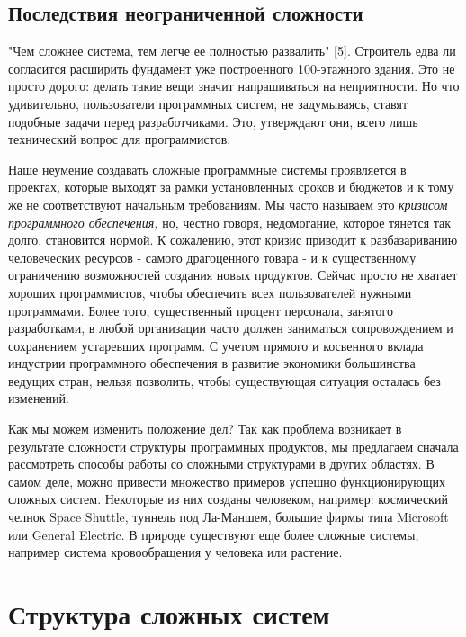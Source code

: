 \documentclass[a4paper,12pt]{article}
\begin{document}
\subsection{Последствия неограниченной сложности}
\begin{small}
\parindent=1.25cm
\hspace{1 cm}
"Чем сложнее система, тем легче ее полностью развалить" [5]. Строитель едва ли согласится расширить фундамент уже построенного 100-этажного здания. Это не просто дорого: делать такие вещи значит напрашиваться на неприятности. Но что удивительно, пользователи программных систем, не задумываясь, ставят подобные задачи перед разработчиками. Это, утверждают они, всего лишь технический вопрос для программистов.\par \medskip 
Наше неумение создавать сложные программные системы проявляется в проектах, которые выходят за рамки установленных сроков и бюджетов и к тому же не соответствуют начальным требованиям. Мы часто называем это \textit{кризисом программного обеспечения,} но, честно говоря, недомогание, которое тянется так долго, становится нормой. К сожалению, этот кризис приводит к разбазариванию человеческих ресурсов - самого драгоценного товара - и к существенному ограничению возможностей создания новых продуктов. Сейчас просто не хватает хороших программистов, чтобы обеспечить всех пользователей нужными программами. Более того, существенный процент персонала, занятого разработками, в любой организации часто должен заниматься сопровождением и сохранением устаревших программ. С учетом прямого и косвенного вклада индустрии программного обеспечения в развитие экономики большинства ведущих стран, нельзя позволить, чтобы существующая ситуация осталась без изменений. \par \medskip
Как мы можем изменить положение дел? Так как проблема возникает в результате сложности структуры программных продуктов, мы предлагаем сначала рассмотреть способы работы со сложными структурами в других областях. В самом деле, можно привести множество примеров успешно функционирующих сложных систем. Некоторые из них созданы человеком, например: космический челнок Space Shuttle, туннель под Ла-Маншем, большие фирмы типа Microsoft или General Electric. В природе существуют еще более сложные системы, например система кровообращения у человека или растение. 
\end{small}
\section{Структура сложных систем}
\end{document}
